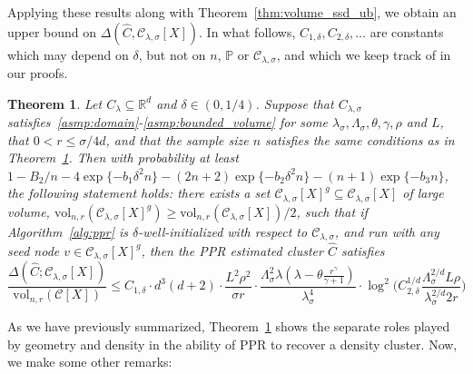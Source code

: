 \documentclass[11pt,twoside]{article}
\newtheorem{theorem}{Theorem}
\theoremstyle{definition}
\newcommand{\Reals}{\mathbb{R}}
\newcommand{\1}{\mathbf{1}}
\newcommand{\Rd}{\Reals^d}
\newcommand{\mc}[1]{\mathcal{#1}}
\newcommand{\Pbb}{\mathbb{P}}
\newcommand{\wh}[1]{\widehat{#1}}
\newcommand{\vol}{\mathrm{vol}}
\begin{document}
\noindent Applying these results along with Theorem~\ref{thm:volume_ssd_ub}, we obtain an upper bound on $\Delta(\wh{C},\mc{C}_{\lambda,\sigma}[X])$. In what follows, $C_{1,\delta},C_{2,\delta},\ldots$ are constants which may depend on $\delta$, but not on $n$, $\Pbb$ or $\mc{C}_{\lambda,\sigma}$, and which we keep track of in our proofs.
\begin{theorem}
	\label{thm:density_cluster_volume_ssd_ub}
	Let $C_{\lambda} \subseteq \Rd$ and $\delta \in (0,1/4)$. Suppose that $C_{\lambda,\sigma}$ satisfies~\ref{asmp:domain}-\ref{asmp:bounded_volume} for some $\lambda_{\sigma}, \Lambda_{\sigma}, \theta, \gamma, \rho$ and $L$, that $0 < r \leq \sigma/4d$, and that the sample size $n$ satisfies the same conditions as in Theorem~\ref{thm:density_cluster_volume_ssd_ub}. Then with probability at least $1 - B_2/n - 4\exp\{-b_1\delta^2n\} - (2n + 2)\exp\{-b_2\delta^2n\} - (n + 1)\exp\{-b_3n\}$, the following statement holds: there exists a set $\mc{C}_{\lambda,\sigma}[X]^g \subseteq \mc{C}_{\lambda,\sigma}[X]$ of large volume, $\vol_{n,r}(\mc{C}_{\lambda,\sigma}[X]^g) \geq \vol_{n,r}(\mc{C}_{\lambda,\sigma}[X])/2$, such that if Algorithm~\ref{alg:ppr} is $\delta$-well-initialized with respect to $\mc{C}_{\lambda,\sigma}$, and run with any seed node $v \in \mc{C}_{\lambda,\sigma}[X]^g$, then the PPR estimated cluster $\wh{C}$ satisfies
	\begin{equation}
	\label{eqn:density_cluster_volume_ssd_ub}
	\frac{\Delta(\wh{C};\mc{C}_{\lambda,\sigma}[X])}{\vol_{n,r}(\mc{C}[X])} \leq C_{1,\delta} \cdot d^3(d + 2) \cdot \frac{L^2\rho^2}{\sigma r} \cdot \frac{\Lambda_{\sigma}^2 \lambda (\lambda - \theta \frac{r^{\gamma}}{\gamma + 1})}{\lambda_{\sigma}^4} \cdot \log^2\biggl(C_{2,\delta}^{1/d} \frac{\Lambda_{\sigma}^{2/d} L\rho}{\lambda_{\sigma}^{2/d}2r}\biggr)
	\end{equation}
\end{theorem}
As we have previously summarized, Theorem~\ref{thm:density_cluster_volume_ssd_ub} shows the separate roles played by geometry and density in the ability of PPR to recover a density cluster. Now, we make some other remarks:
\end{document}
